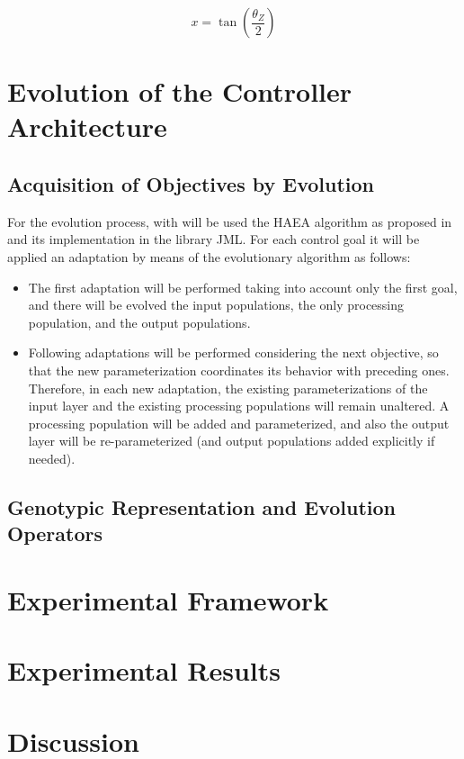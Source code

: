 \begin{equation}
  \label{eq:eqn-outval}
  x=\tan(\frac{\theta_Z}{2})
\end{equation}

\section{Evolution of the Controller Architecture}
\label{sec:chp3-evolution}
\subsection{Acquisition of Objectives by Evolution}
For the evolution process, with will be used the HAEA algorithm as
proposed in \cite{JonantanHaea} and its implementation in the library
JML. For each control goal it will be applied an adaptation by means
of the evolutionary algorithm as follows:

\begin{itemize}
\item The first adaptation will be performed taking into account only
  the first goal, and there will be evolved the input populations, the
  only processing population, and the output populations.

\item Following adaptations will be performed considering the next
  objective, so that the new parameterization coordinates its behavior
  with preceding ones. Therefore, in each new adaptation, the existing
  parameterizations of the input layer and the existing processing
  populations will remain unaltered. A processing population will be
  added and parameterized, and also the output layer will be
  re-parameterized (and output populations added explicitly if
  needed).
\end{itemize}

\subsection{Genotypic Representation and Evolution Operators}

\section{Experimental Framework}
\label{sec:chp3-experimental}

\section{Experimental Results}
\label{sec:chp3-results}

\section{Discussion}
\label{sec:chp3-discussion}

